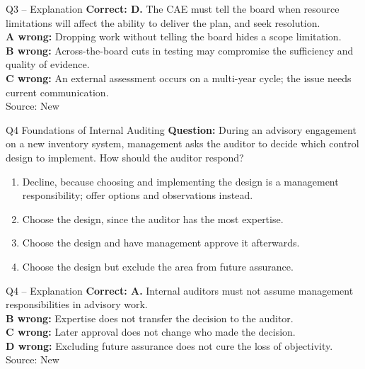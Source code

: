 \documentclass[aspectratio=169,10pt]{beamer}
\begin{document}
\begin{frame}[t]{Q3 -- Explanation}
	\footnotesize
	\textbf{Correct: D.} The CAE must tell the board when resource limitations will affect the ability to deliver the plan, and seek resolution. \\[5pt]
\textbf{A wrong:} Dropping work without telling the board hides a scope limitation. \\[3pt]
\textbf{B wrong:} Across-the-board cuts in testing may compromise the sufficiency and quality of evidence. \\[3pt]
\textbf{C wrong:} An external assessment occurs on a multi-year cycle; the issue needs current communication. \\[3pt]
	\vfill {\tiny Source: New}
\end{frame}

\begin{frame}[t]{Q4 \hfill {\scriptsize Foundations of Internal Auditing}}
	\small
	\textbf{Question:} During an advisory engagement on a new inventory system, management asks the auditor to decide which control design to implement. How should the auditor respond?
	\begin{enumerate}[label=\Alph*.,itemsep=1pt,topsep=3pt]
			\item Decline, because choosing and implementing the design is a management responsibility; offer options and observations instead.
			\item Choose the design, since the auditor has the most expertise.
			\item Choose the design and have management approve it afterwards.
			\item Choose the design but exclude the area from future assurance.
	\end{enumerate}
\end{frame}

\begin{frame}[t]{Q4 -- Explanation}
	\footnotesize
	\textbf{Correct: A.} Internal auditors must not assume management responsibilities in advisory work. \\[5pt]
\textbf{B wrong:} Expertise does not transfer the decision to the auditor. \\[3pt]
\textbf{C wrong:} Later approval does not change who made the decision. \\[3pt]
\textbf{D wrong:} Excluding future assurance does not cure the loss of objectivity. \\[3pt]
	\vfill {\tiny Source: New}
\end{frame}
\end{document}
